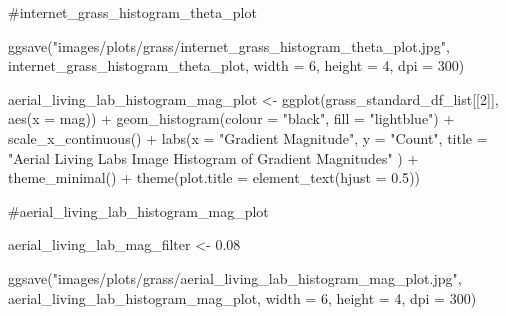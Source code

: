 \documentclass[
  letterpaper,
  DIV=11,
  numbers=noendperiod]{scrreprt}
\newenvironment{Shaded}{\begin{snugshade}}{\end{snugshade}}
\newcommand{\AttributeTok}[1]{\textcolor[rgb]{0.40,0.45,0.13}{#1}}
\newcommand{\CommentTok}[1]{\textcolor[rgb]{0.37,0.37,0.37}{#1}}
\newcommand{\DecValTok}[1]{\textcolor[rgb]{0.68,0.00,0.00}{#1}}
\newcommand{\FloatTok}[1]{\textcolor[rgb]{0.68,0.00,0.00}{#1}}
\newcommand{\FunctionTok}[1]{\textcolor[rgb]{0.28,0.35,0.67}{#1}}
\newcommand{\NormalTok}[1]{\textcolor[rgb]{0.00,0.23,0.31}{#1}}
\newcommand{\OtherTok}[1]{\textcolor[rgb]{0.00,0.23,0.31}{#1}}
\newcommand{\SpecialCharTok}[1]{\textcolor[rgb]{0.37,0.37,0.37}{#1}}
\newcommand{\StringTok}[1]{\textcolor[rgb]{0.13,0.47,0.30}{#1}}
\begin{document}
\begin{Shaded}
\begin{Highlighting}[]
\CommentTok{\#internet\_grass\_histogram\_theta\_plot}

\FunctionTok{ggsave}\NormalTok{(}\StringTok{"images/plots/grass/internet\_grass\_histogram\_theta\_plot.jpg"}\NormalTok{, internet\_grass\_histogram\_theta\_plot, }\AttributeTok{width =} \DecValTok{6}\NormalTok{, }\AttributeTok{height =} \DecValTok{4}\NormalTok{, }\AttributeTok{dpi =} \DecValTok{300}\NormalTok{)}
\end{Highlighting}
\end{Shaded}

\begin{Shaded}
\begin{Highlighting}[]
\NormalTok{aerial\_living\_lab\_histogram\_mag\_plot }\OtherTok{\textless{}{-}}
  \FunctionTok{ggplot}\NormalTok{(grass\_standard\_df\_list[[}\DecValTok{2}\NormalTok{]], }
         \FunctionTok{aes}\NormalTok{(}\AttributeTok{x =}\NormalTok{ mag)) }\SpecialCharTok{+}
  \FunctionTok{geom\_histogram}\NormalTok{(}\AttributeTok{colour =} \StringTok{"black"}\NormalTok{, }\AttributeTok{fill =} \StringTok{"lightblue"}\NormalTok{) }\SpecialCharTok{+}
  \FunctionTok{scale\_x\_continuous}\NormalTok{() }\SpecialCharTok{+} 
  \FunctionTok{labs}\NormalTok{(}\AttributeTok{x =} \StringTok{"Gradient Magnitude"}\NormalTok{, }
       \AttributeTok{y =} \StringTok{"Count"}\NormalTok{, }
       \AttributeTok{title =} \StringTok{"Aerial Living Labs Image Histogram of Gradient Magnitudes"}
\NormalTok{       ) }\SpecialCharTok{+}
  \FunctionTok{theme\_minimal}\NormalTok{() }\SpecialCharTok{+}
  \FunctionTok{theme}\NormalTok{(}\AttributeTok{plot.title =} \FunctionTok{element\_text}\NormalTok{(}\AttributeTok{hjust =} \FloatTok{0.5}\NormalTok{))}

\CommentTok{\#aerial\_living\_lab\_histogram\_mag\_plot}

\NormalTok{aerial\_living\_lab\_mag\_filter }\OtherTok{\textless{}{-}} \FloatTok{0.08}

\FunctionTok{ggsave}\NormalTok{(}\StringTok{"images/plots/grass/aerial\_living\_lab\_histogram\_mag\_plot.jpg"}\NormalTok{, }
\NormalTok{       aerial\_living\_lab\_histogram\_mag\_plot, }\AttributeTok{width =} \DecValTok{6}\NormalTok{, }\AttributeTok{height =} \DecValTok{4}\NormalTok{, }\AttributeTok{dpi =} \DecValTok{300}\NormalTok{)}




\end{Highlighting}
\end{Shaded}
\end{document}
